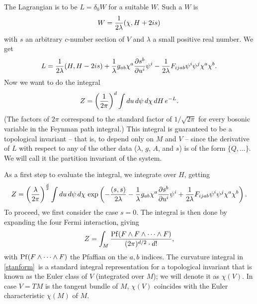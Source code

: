 \documentclass[12pt]{article}
\numberwithin{equation}{section}
\begin{document}
The Lagrangian is to be $L=\delta_0 W$ for a suitable $W$.  Such a
$W$ is
\begin{equation}
  \label{suitv}
  W ={1\over 2 \lambda }(\chi,H+2is)
\end{equation}
with $s$ an arbitrary $c$-number section of $V$ and $\lambda$ a small
positive real number.  We get
\begin{equation}
  \label{hurgo}
  L= {1\over 2\lambda }(H,H-2is)+{1\over \lambda}g_{ab}\chi^a
  {\partial s^b \over \partial u^i}\psi^i -{1\over
  2\lambda}F_{ijab}\psi^i\psi^j\chi^a\chi^b .
\end{equation}
Now we want to do the integral
\begin{equation}
  \label{uitv}
  Z=\left({1\over 2\pi}\right)^d \int d u\,d\psi\,d\chi\,dH\,e^{-L}.
\end{equation}
(The factors of $2\pi$ correspond to the standard factor of $1/\sqrt{2\pi}$
for every bosonic variable in the Feynman path integral.)
This integral is guaranteed to be a topological invariant -- that is, to
depend only on $M$ and $V$
-- since the derivative of $L$ with respect to any of the other data
($\lambda$, $g$, $A$, and $s$) is of the form $\{Q,\dots\}$.
We will call it the partition invariant of the system.

As a first step to evaluate the integral, we integrate over $H$, getting
%
\begin{equation}
  \label{putv}
  Z=\left({\lambda\over 2\pi}\right)^{d\over 2} \int du\,d\psi\,
  d\chi\, \exp\left(-{(s,s)\over
    2\lambda}-{1\over\lambda}g_{ab}\chi^a{\partial s^b \over \partial
  u^i}\psi^i+{1\over 2\lambda}F_{ijab}\psi^i\psi^j\chi^a\chi^b \right).
\end{equation}
To proceed, we first consider the case $s=0$.
The integral is then done by expanding the four Fermi interaction, giving
\begin{equation}
  \label{stanform}
  Z= \int_M{{\rm Pf}(F\wedge F\wedge \dots\wedge F)\over (2\pi)^{d/2}\cdot d!},
\end{equation}
with ${\rm Pf}(F\wedge \dots \wedge F)$ the Pfaffian on the $a,b$
indices.  The curvature integral in \eqref{stanform}\ is a standard integral
representation for a topological invariant that is known as the Euler
class of $V$ (integrated over $M$); we will denote it as $\chi(V)$.
In case $V=TM$ is the tangent bundle of $M$,
$\chi(V)$ coincides with the Euler characteristic $\chi(M)$ of $M$.
\end{document}

